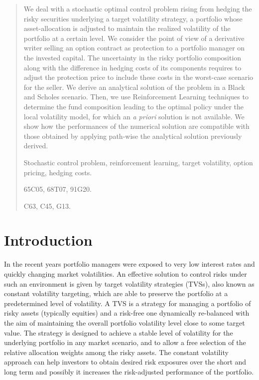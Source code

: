 \documentclass[runningheads]{m2ef}
\begin{document}
	\begin{abstract}
	We deal with a stochastic optimal control problem rising from hedging the risky securities underlying a target volatility strategy, a portfolio whose asset-allocation is adjusted to maintain the realized volatility of the portfolio at a certain level. We consider the point of view of a derivative writer selling an option contract as protection to a portfolio manager on the invested capital. The uncertainty in the risky portfolio composition along with the difference in hedging costs of its components requires to adjust the protection price to include these costs in the worst-case scenario for the seller. We derive an analytical solution of the problem in a Black and Scholes scenario. Then, we use Reinforcement Learning techniques to determine the fund composition leading to the optimal policy under the local volatility model, for which an {\it a priori} solution is not available. We show how the performances of the numerical solution are compatible with those obtained by applying path-wise the analytical solution previously derived.

	\smallskip

	 Stochastic control problem, reinforcement learning, target volatility, option pricing, hedging costs.

	\smallskip

	 \textsc{\small 65C05, 68T07, 91G20.}

	 \textsc{\small C63, C45, G13.}
	\end{abstract}

	\bigskip

	\section{Introduction}
	In the recent years portfolio managers were exposed to very low interest rates and quickly changing market volatilities. An effective solution to control risks under such an environment is given by target volatility strategies (TVSs), also known as constant volatility targeting, which are able to preserve the portfolio at a predetermined level of volatility. A TVS is a strategy for managing a portfolio of risky assets (typically  equities) and a risk-free one dynamically re-balanced with the aim of maintaining the overall portfolio volatility level close to some target value. The strategy is designed to achieve a stable level of volatility for the underlying portfolio in any market scenario, and to allow a free selection of the relative allocation weights among the risky assets. The constant volatility approach can help investors to obtain desired risk exposures over the short and long term and possibly it increases the risk-adjusted performance of the portfolio.
\end{document}
